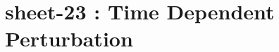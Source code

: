 
\chapter{sheet-23 : Time Dependent Perturbation}
\ifpdf
\graphicspath{{Chapter23/figs/}}
\else
\graphicspath{{Chapter23/figs/}}
\fi


